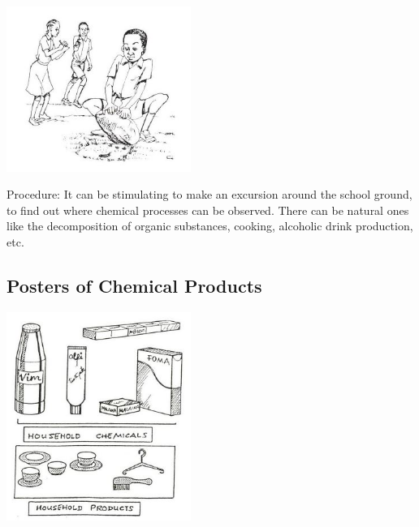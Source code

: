 \begin{multicols}{2}
\begin{center}
\includegraphics[width=0.45\textwidth]{./img/source/excursion.jpg}
\end{center}

\begin{description*}
\item[Procedure:]{It can be stimulating to make an excursion
around the school ground, to find out where
chemical processes can be observed. There can
be natural ones like the decomposition of organic
substances, cooking, alcoholic drink
production, etc.}
\end{description*}

\subsection{Posters of Chemical Products}

\begin{center}
\includegraphics[width=0.45\textwidth]{./img/source/chemical-posters.jpg}
\end{center}


\end{multicols}
